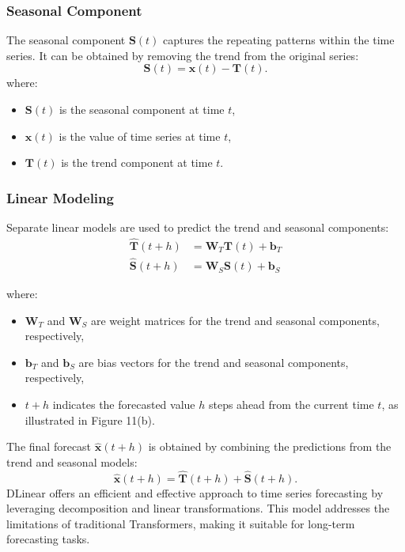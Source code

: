 \documentclass{ieeeojies}
\begin{document}
\subsubsection{Seasonal Component}
The seasonal component $\mathbf{S}(t)$ captures the repeating patterns within the time series. It can be obtained by removing the trend from the original series:
\begin{equation}
    \mathbf{S}(t) = \mathbf{x}(t) - \mathbf{T}(t).
\end{equation}
where:
\begin{itemize}
    \item $\mathbf{S}(t)$ is the seasonal component at time $t$,
    \item $\mathbf{x}(t)$ is the value of time series at time $t$,
    \item $\mathbf{T}(t)$ is the trend component at time $t$.
\end{itemize}

\subsubsection{Linear Modeling}
Separate linear models are used to predict the trend and seasonal components:
\begin{align}
    \hat{\mathbf{T}}(t+h) & = \mathbf{W}_T \mathbf{T}(t) + \mathbf{b}_T \\
    \hat{\mathbf{S}}(t+h) & = \mathbf{W}_S \mathbf{S}(t) + \mathbf{b}_S
\end{align}

where:
\begin{itemize}
    \item $\mathbf{W}_T$ and $\mathbf{W}_S$ are weight matrices for the trend and seasonal components, respectively,
    \item $\mathbf{b}_T$ and $\mathbf{b}_S$ are bias vectors for the trend and seasonal components, respectively,
    \item $t+h$ indicates the forecasted value $h$ steps ahead from the current time $t$, as illustrated in Figure 11(b).
\end{itemize}

The final forecast \( \hat{\mathbf{x}}(t+h) \) is obtained by combining the predictions from the trend and seasonal models:
\begin{equation}
    \hat{\mathbf{x}}(t+h) = \hat{\mathbf{T}}(t+h) + \hat{\mathbf{S}}(t+h).
\end{equation}
DLinear offers an efficient and effective approach to time series forecasting by leveraging decomposition and linear transformations. This model addresses the limitations of traditional Transformers, making it suitable for long-term forecasting tasks.
\end{document}
